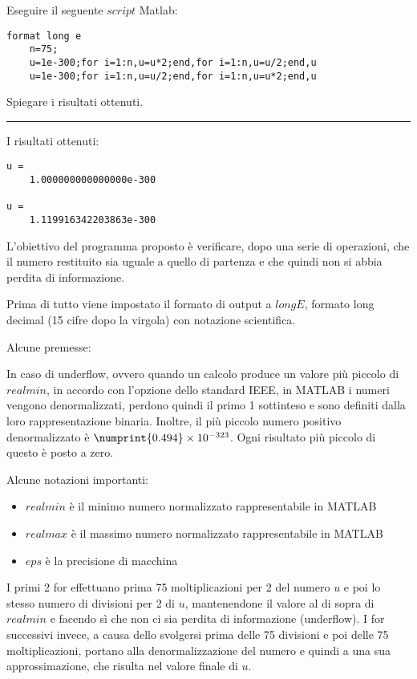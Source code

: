 Eseguire il seguente $script$ Matlab:
\begin{lstlisting}[caption = {}]
	format long e
	n=75;
	u=1e-300;for i=1:n,u=u*2;end,for i=1:n,u=u/2;end,u
	u=1e-300;for i=1:n,u=u/2;end,for i=1:n,u=u*2;end,u
\end{lstlisting}
Spiegare i risultati ottenuti.

\hspace*{\fill}
\par\noindent\rule{\textwidth}{0.4pt}
\hspace*{\fill}

I risultati ottenuti:
\begin{lstlisting}[caption = {}]
u = 
	1.000000000000000e-300

u = 
	1.119916342203863e-300
\end{lstlisting}

L'obiettivo del programma proposto è verificare, dopo una serie di operazioni, che il numero restituito sia uguale a quello di partenza e
che quindi non si abbia perdita di informazione.

Prima di tutto viene impostato il formato di output a $longE$, formato long decimal (15 cifre dopo la virgola) con notazione scientifica.

Alcune premesse:

In caso di underflow, ovvero quando un calcolo produce un valore più piccolo di $realmin$, in accordo con l’opzione dello standard IEEE, 
in MATLAB i numeri vengono denormalizzati, perdono quindi il primo 1 sottinteso e sono definiti dalla loro rappresentazione binaria.
Inoltre, il più piccolo numero positivo denormalizzato è $\numprint{0.494}\times10^{-323}$. Ogni risultato più piccolo di questo è posto a zero.

Alcune notazioni importanti:
\begin{itemize}
	\item $realmin$ è il minimo numero normalizzato rappresentabile in MATLAB
	\item $realmax$ è il massimo numero normalizzato rappresentabile in MATLAB
	\item $eps$ è la precisione di macchina
\end{itemize}

I primi 2 for effettuano prima 75 moltiplicazioni per 2 del numero $u$ e poi lo stesso numero di divisioni per 2 di $u$, 
mantenendone il valore al di sopra di $realmin$ e facendo sì che non ci sia perdita di informazione (underflow).
I for successivi invece, a causa dello svolgersi prima delle 75 divisioni e poi delle 75 moltiplicazioni, portano alla denormalizzazione del numero e
quindi a una sua approssimazione, che risulta nel valore finale di $u$.
